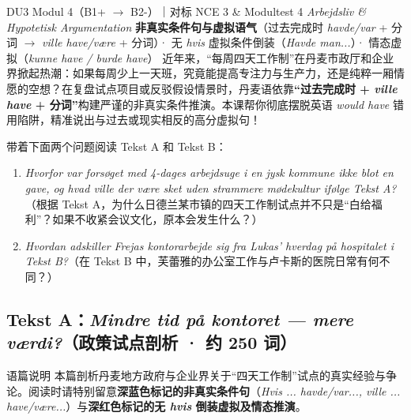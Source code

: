 {DU3 Modul 4（B1+ $\rightarrow$ B2-）｜对标 NCE 3 \& Modultest 4 \textit{Arbejdsliv \& Hypotetisk Argumentation}}
{\textbf{非真实条件句与虚拟语气}（过去完成时 \textit{havde/var} + 分词 $\rightarrow$ \textit{ville have/være} + 分词）· 无 \textit{hvis} 虚拟条件倒装（\textit{Havde man...}）· 情态虚拟（\textit{kunne have / burde have}）}
{近年来，“每周四天工作制”在丹麦市政厅和企业界掀起热潮：如果每周少上一天班，究竟能提高专注力与生产力，还是纯粹一厢情愿的空想？在复盘试点项目或反驳假设情景时，丹麦语依靠\textbf{“过去完成时 + \textit{ville have} + 分词”}构建严谨的非真实条件推演。本课帮你彻底摆脱英语 \textit{would have} 错用陷阱，精准说出与过去或现实相反的高分虚拟句！}

\begin{foerduleaeser}
带着下面两个问题阅读 Tekst A 和 Tekst B：
\begin{enumerate}
  \item \textit{Hvorfor var forsøget med 4-dages arbejdsuge i en jysk kommune ikke blot en gave, og hvad ville der være sket uden strammere mødekultur ifølge Tekst A?}（根据 Tekst A，为什么日德兰某市镇的四天工作制试点并不只是“白给福利”？如果不收紧会议文化，原本会发生什么？）
  \item \textit{Hvordan adskiller Frejas kontorarbejde sig fra Lukas' hverdag på hospitalet i Tekst B?}（在 Tekst B 中，芙蕾雅的办公室工作与卢卡斯的医院日常有何不同？）
\end{enumerate}
\end{foerduleaeser}


\subsection*{Tekst A：\textit{Mindre tid på kontoret --- mere værdi?}（政策试点剖析 · 约 250 词）}

\begin{tipbox}{语篇说明}
本篇剖析丹麦地方政府与企业界关于“四天工作制”试点的真实经验与争论。阅读时请特别留意\textbf{\color{NCDNavy}深蓝色标记的非真实条件句}（\textit{Hvis ... havde/var..., ville ... have/være...}）与\textbf{\color{NCDRed}深红色标记的无 \textit{hvis} 倒装虚拟及情态推演}。
\end{tipbox}

